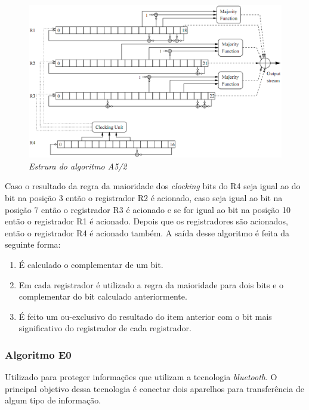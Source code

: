 \begin{figure}[h]
\centering
\includegraphics[keepaspectratio=true,scale=0.5]
    {figuras/a5_2.eps}
    \caption[\textit{Estrura do algoritmo A5/2}]{\textit{Estrura do algoritmo A5/2}\protect\footnotemark } 
\end{figure}

Caso o resultado da regra da maioridade dos \textit{clocking} bits do R4 seja igual ao do bit na posição 3 então o registrador R2 é acionado, caso seja igual ao bit na posição 7 então o registrador R3 é acionado e se for igual ao bit na posição 10 então o registrador R1 é acionado. Depois que os registradores são acionados, então o registrador R4 é acionado também. A saída desse algoritmo é feita da seguinte forma:

\begin{enumerate}
	\item É calculado o complementar de um bit.
	\item Em cada registrador é utilizado a regra da maioridade para dois bits e o complementar do bit calculado anteriormente. 
	\item É feito um ou-exclusivo do resultado do item anterior com o bit mais significativo do registrador de cada registrador.
\end{enumerate}

\subsubsection{Algoritmo E0}
\label{algorithm-e0}

Utilizado para proteger informações que utilizam a tecnologia \textit{bluetooth}. O principal objetivo dessa tecnologia é conectar dois aparelhos para transferência de algum tipo de informação.

